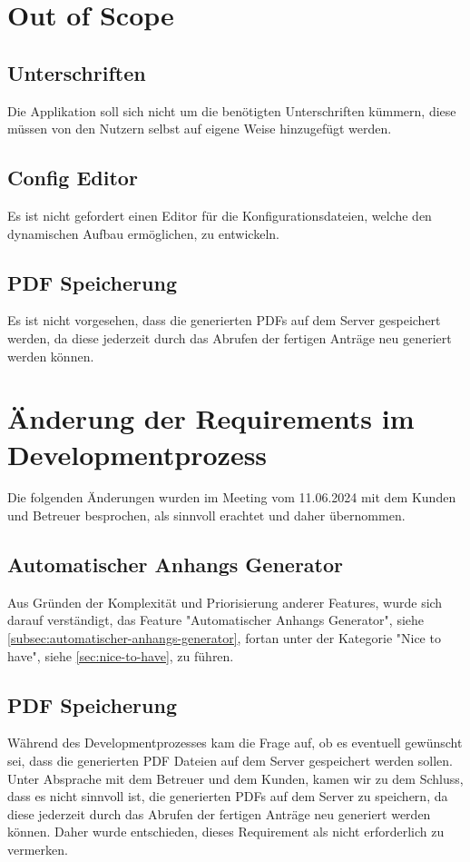 \section{Out of Scope}\label{sec:nicht-anforderung}
\subsection{Unterschriften}\label{subsec:unterschriften}
Die Applikation soll sich nicht um die benötigten Unterschriften kümmern,
diese müssen von den Nutzern selbst auf eigene Weise hinzugefügt werden.
\subsection{Config Editor}\label{subsec:config-editor}
Es ist nicht gefordert einen Editor für die Konfigurationsdateien, welche den dynamischen Aufbau ermöglichen, zu entwickeln.


\subsection{PDF Speicherung}\label{subsec: pdf speicherung}
Es ist nicht vorgesehen, dass die generierten \ac{PDF}s auf dem Server gespeichert werden, 
da diese jederzeit durch das Abrufen der fertigen Anträge neu generiert werden können.

\section{Änderung der Requirements im Developmentprozess}
Die folgenden Änderungen wurden im Meeting vom 11.06.2024 mit dem Kunden und Betreuer 
besprochen, als sinnvoll erachtet und daher übernommen.

\subsection{Automatischer Anhangs Generator}
Aus Gründen der Komplexität und Priorisierung anderer Features, wurde sich darauf verständigt, das Feature "Automatischer Anhangs Generator", siehe \ref{subsec:automatischer-anhangs-generator}, fortan unter der Kategorie "Nice to have", siehe \ref{sec:nice-to-have}, 
zu führen.

\subsection{\ac{PDF} Speicherung}\label{subsec: pdf speicherung}
Während des Developmentprozesses kam die Frage auf, ob es eventuell gewünscht sei, dass die 
generierten \ac{PDF} Dateien auf dem Server gespeichert werden sollen.
Unter Absprache mit dem Betreuer und dem Kunden, kamen wir zu dem Schluss, dass
es nicht sinnvoll ist, die generierten \ac{PDF}s auf dem Server zu speichern, 
da diese jederzeit durch das Abrufen der fertigen Anträge neu generiert werden können. 
Daher wurde entschieden, dieses Requirement als nicht erforderlich zu vermerken.